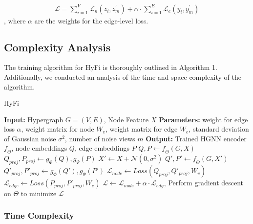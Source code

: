 \begin{equation}
\begin{aligned}
    \mathcal{L} = \sum_{i=1}^V \mathcal{L}_n(z_i, z_{m}^{\prime}) + \alpha \cdot \sum_{i=1}^E \mathcal{L}_e(y_i, y_{m}^{\prime})
\end{aligned}
\end{equation},
where $\alpha$ are the weights for the edge-level loss.

\subsection{Complexity Analysis}


The training algorithm for HyFi is thoroughly outlined in Algorithm 1. Additionally, we conducted an analysis of the time and space complexity of the algorithm.

\begin{algorithm}
    \caption{HyFi}
    \begin{algorithmic}[1]
        \State \textbf{Input:} Hypergraph $G = (V, E)$, Node Feature $X$
        \State \textbf{Parameters:} weight for edge loss $\alpha$, weight matrix for node $W_v$, weight matrix for edge $W_e$, standard deviation of Gaussian noise $\sigma^2$, number of noise views $m$
        \State \textbf{Output:} Trained HGNN encoder $\mathit{f}_{\Theta}$, node embeddings $Q$, edge embeddings $P$
            \State $Q, P \gets \mathit{f}_{\Theta}(G, X)$
            \State $Q_{proj}, P_{proj} \gets \mathit{g}_{\Phi}(Q), \mathit{g}_{\Psi}(P)$
                \State $X' \gets X + \mathcal{N}(0, \sigma^2)$
                \State $Q', P' \gets \mathit{f}_{\Theta}(G, X')$
                \State $Q'_{proj}, P'_{proj} \gets \mathit{g}_{\Phi}(Q'), \mathit{g}_{\Psi}(P')$ 
            \EndFor
            \State $\mathcal{L}_{node} \gets Loss(Q_{proj}, Q'_{proj}, W_v)$
            \State $\mathcal{L}_{edge} \gets Loss(P_{proj}, P'_{proj}, W_e)$
            \State $\mathcal{L} \gets \mathcal{L}_{node} + \alpha \cdot \mathcal{L}_{edge}$
            \State Perform gradient descent on $\Theta$ to minimize $\mathcal{L}$
        \EndFor
    \end{algorithmic}
\end{algorithm}


\subsubsection{Time Complexity}

